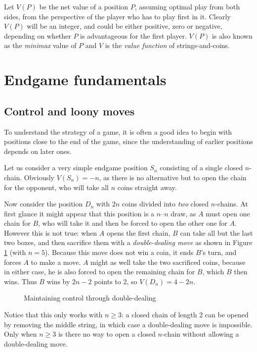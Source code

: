 \documentclass[a4paper,twocolumn]{article}
\begin{document}
Let $V(P)$ be the net value of a position $P$, assuming optimal play
from both sides, from the perspective of the player who has to play
first in it. Clearly $V(P)$ will be an integer, and could be either
positive, zero or negative, depending on whether $P$ is advantageous
for the first player. $V(P)$ is also known as the \emph{minimax} value
of $P$ and $V$ is the \emph{value function} of strings-and-coins.

\section{Endgame fundamentals}

\subsection{Control and loony moves}

To understand the strategy of a game, it is often a good idea to begin
with positions close to the end of the game, since the understanding
of earlier positions depends on later ones.

Let us consider a very simple endgame position $S_n$ consisting of a
single closed $n$-chain. Obviously $V(S_n)=-n$, as there is no
alternative but to open the chain for the opponent, who will take all
$n$ coins straight away.

Now consider the position $D_n$ with $2n$ coins divided into
\emph{two} closed $n$-chains. At first glance it might appear that
this position is a $n$--$n$ draw, as $A$ must open one chain for $B$,
who will take it and then be forced to open the other one for
$A$. However this is not true: when $A$ opens the first chain, $B$ can
take all but the last two boxes, and then sacrifice them with a
\emph{double-dealing move} as shown in Figure \ref{dddemo} (with
$n=5$). Because this move does not win a coin, it ends $B$'s turn, and
forces $A$ to make a move. $A$ might as well take the two sacrificed
coins, because in either case, he is also forced to open the remaining
chain for $B$, which $B$ then wins. Thus $B$ wins by $2n - 2$ points
to 2, so $V(D_n) = 4-2n$.

\begin{figure}
  \centering
  \def\svgscale{0.7}
  
  \caption{Maintaining control through double-dealing}
  \label{dddemo}
\end{figure}

Notice that this only works with $n \ge 3$: a closed chain of length 2
can be opened by removing the middle string, in which case a
double-dealing move is impossible. Only when $n \ge 3$ is there no way
to open a closed $n$-chain without allowing a double-dealing move.
\end{document}
